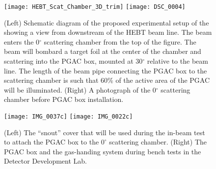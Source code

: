 \begin{figure}[ht]
\centering
\hspace{\fill}
\texttt{[image: HEBT\_Scat\_Chamber\_3D\_trim]}\hspace{\fill}
\texttt{[image: DSC\_0004]} \hspace{\fill}
\caption{(Left) Schematic diagram of the proposed experimental setup of the 
showing a view from downstream of the HEBT beam line.  The beam enters the 0$^\circ$ scattering chamber from the top of the figure.  The beam will bombard a target foil at the center of the chamber and scattering into the PGAC box, mounted at 30$^\circ$ relative to the beam line.  The length of the beam pipe connecting the PGAC box to the scattering chamber is such that 60\% of the active area of the PGAC will be illuminated.  (Right) A photograph of the 0$^\circ$ scattering chamber before PGAC box installation.
}
\label{schematic}
\end{figure}
\begin{figure}[ht]%
\centering
\hspace{\fill}
\texttt{[image: IMG\_0037c]} \hspace{\fill}
\texttt{[image: IMG\_0022c]} \hspace{\fill}
\caption{(Left) The ``snout'' cover that will be used during the in-beam test to attach the PGAC box to the $0^\circ$ scattering chamber. (Right) The PGAC box and the gas-handing system during bench tests in the Detector Development Lab.}%
\label{photos}%
\end{figure}

